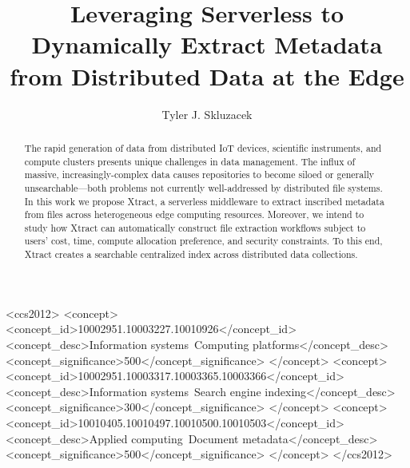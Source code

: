 \documentclass[sigconf, 9pt]{acmart}
\newcommand{\name}{Xtract}
\begin{document}
\title{Leveraging Serverless to Dynamically Extract Metadata from Distributed Data at the Edge}

\author{Tyler J. Skluzacek} 



\renewcommand{\shortauthors}{Skluzacek et al.}

\begin{abstract}

The rapid generation of data from distributed IoT devices, scientific instruments, and compute clusters presents
unique challenges in data management. The influx of massive, increasingly-complex data causes repositories to become 
siloed or generally unsearchable---both problems not currently well-addressed by distributed file systems.  
In this work we propose \name{}, a serverless middleware 
to extract inscribed metadata from files across heterogeneous edge computing resources. Moreover, we intend to study how \name{} can
automatically construct file extraction workflows subject to users' cost, time, compute allocation preference, and security constraints. 
To this end, \name{} creates a searchable centralized index across distributed data collections.


\end{abstract}

\begin{CCSXML}
<ccs2012>
<concept>
<concept_id>10002951.10003227.10010926</concept_id>
<concept_desc>Information systems~Computing platforms</concept_desc>
<concept_significance>500</concept_significance>
</concept>
<concept>
<concept_id>10002951.10003317.10003365.10003366</concept_id>
<concept_desc>Information systems~Search engine indexing</concept_desc>
<concept_significance>300</concept_significance>
</concept>
<concept>
<concept_id>10010405.10010497.10010500.10010503</concept_id>
<concept_desc>Applied computing~Document metadata</concept_desc>
<concept_significance>500</concept_significance>
</concept>
</ccs2012>
\end{CCSXML}



\maketitle
\end{document}
